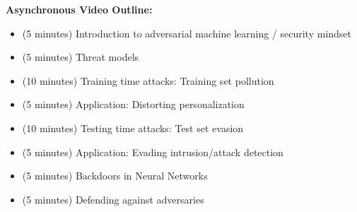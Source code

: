 \documentclass[12pt]{article}
\renewcommand{\_}{\kern-1.5pt\textunderscore\kern-1.5pt}
\begin{document}
\textbf{Asynchronous Video Outline:}\par



\begin{itemize}
	\item (5 minutes) Introduction to adversarial machine learning / security mindset\par

	\item (5 minutes) Threat models\par

	\item (10 minutes) Training time attacks: Training set pollution\par

	\item (5 minutes) Application: Distorting personalization\par

	\item (10 minutes) Testing time attacks: Test set evasion\par

	\item (5 minutes) Application: Evading intrusion/attack detection\par

	\item (5 minutes) Backdoors in Neural Networks\par

	\item (5 minutes) Defending against adversaries
\end{itemize}\par


\newpage
\end{document}
